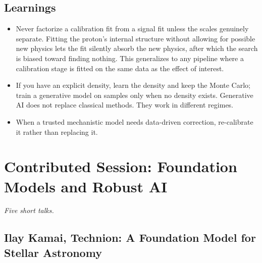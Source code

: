 \documentclass[11pt]{article}
\begin{document}
\subsection*{Learnings}
\begin{itemize}
    \item Never factorize a calibration fit from a signal fit unless the scales genuinely separate. Fitting the proton's internal structure without allowing for possible new physics lets the fit silently absorb the new physics, after which the search is biased toward finding nothing. This generalizes to any pipeline where a calibration stage is fitted on the same data as the effect of interest.
    \item If you have an explicit density, learn the density and keep the Monte Carlo; train a generative model on samples only when no density exists. Generative AI does not replace classical methods. They work in different regimes.
    \item When a trusted mechanistic model needs data-driven correction, re-calibrate it rather than replacing it.
\end{itemize}

\clearpage
\section{Contributed Session: Foundation Models and Robust AI}

\emph{Five short talks.}

\subsection*{Ilay Kamai, Technion: A Foundation Model for Stellar Astronomy}
\end{document}
